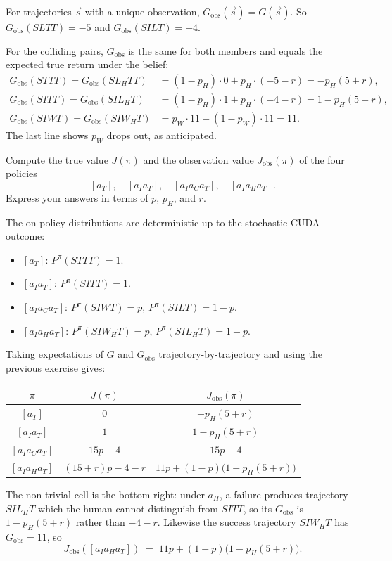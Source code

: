 \documentclass[11pt]{article}
\newcommand{\Gobs}{G_{\mathrm{obs}}}
\newcommand{\Jobs}{J_{\mathrm{obs}}}
\begin{document}
\begin{solution}
For trajectories $\vec s$ with a unique observation, $\Gobs(\vec s) = G(\vec s)$. So
$\Gobs(SLTT) = -5$ and $\Gobs(SILT) = -4$.

For the colliding pairs, $\Gobs$ is the same for both members and equals the
expected true return under the belief:
\begin{align*}
\Gobs(STTT) = \Gobs(SL_HTT) &= (1-p_H)\cdot 0 + p_H \cdot (-5-r) = -p_H(5+r), \\
\Gobs(SITT) = \Gobs(SIL_HT) &= (1-p_H)\cdot 1 + p_H\cdot(-4-r) = 1 - p_H(5+r), \\
\Gobs(SIWT) = \Gobs(SIW_HT) &= p_W \cdot 11 + (1-p_W)\cdot 11 = 11.
\end{align*}
The last line shows $p_W$ drops out, as anticipated.
\end{solution}


\begin{exercise}
\label{prob:policyvalues}
Compute the true value $J(\pi)$
and the observation value $\Jobs(\pi)$ of the four policies
$$
[a_T],\quad [a_I a_T],\quad [a_I a_C a_T],\quad [a_I a_H a_T].
$$
Express your answers in terms of $p$, $p_H$, and $r$.
\end{exercise}

\begin{solution}
The on-policy distributions are deterministic up to the stochastic CUDA
outcome:
\begin{itemize}
    \item $[a_T]$: $P^\pi(STTT) = 1$.
    \item $[a_I a_T]$: $P^\pi(SITT) = 1$.
    \item $[a_I a_C a_T]$: $P^\pi(SIWT) = p$, $P^\pi(SILT) = 1-p$.
    \item $[a_I a_H a_T]$: $P^\pi(SIW_HT) = p$, $P^\pi(SIL_HT) = 1-p$.
\end{itemize}
Taking expectations of $G$ and $\Gobs$ trajectory-by-trajectory and using the previous exercise gives:
\begin{center}
\begin{tabular}{c|c|c}
$\pi$              & $J(\pi)$           & $\Jobs(\pi)$ \\\hline
$[a_T]$            & $0$                & $-p_H(5+r)$ \\
$[a_I a_T]$        & $1$                & $1 - p_H(5+r)$ \\
$[a_I a_C a_T]$    & $15p - 4$          & $15p - 4$ \\
$[a_I a_H a_T]$    & $(15+r)p - 4 - r$  & $11p + (1-p)\bigl(1 - p_H(5+r)\bigr)$
\end{tabular}
\end{center}
The non-trivial cell is the bottom-right: under $a_H$, a failure produces
trajectory $SIL_HT$ which the human cannot distinguish from $SITT$, so its
$\Gobs$ is $1 - p_H(5+r)$ rather than $-4-r$. Likewise the success
trajectory $SIW_HT$ has $\Gobs = 11$, so
$$
\Jobs([a_I a_H a_T]) \;=\; 11p + (1-p)\bigl(1 - p_H(5+r)\bigr).
$$
\end{solution}
\end{document}
